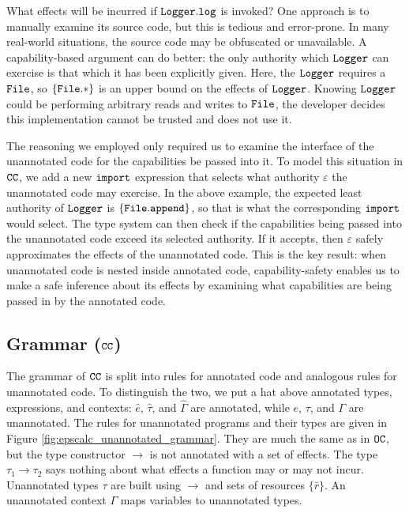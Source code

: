 What effects will be incurred if $\mathtt{Logger.log}$ is invoked? One approach is to manually examine its source code, but this is tedious and error-prone. In many real-world situations, the source code may be obfuscated or unavailable. A capability-based argument can do better: the only authority which $\mathtt{Logger}$ can exercise is that which it has been explicitly given. Here, the $\mathtt{Logger}$ requires a $\mathtt{File}$, so $\mathtt{ \{ \mathtt{File.*} \} }$ is an upper bound on the effects of $\mathtt{Logger}$. Knowing $\mathtt{Logger}$ could be performing arbitrary reads and writes to $\mathtt{File}$, the developer decides this implementation cannot be trusted and does not use it.

The reasoning we employed only required us to examine the interface of the unannotated code for the capabilities be passed into it. To model this situation in $\mathtt{CC}$, we add a new $\mathtt{import}$ expression that selects what authority $\varepsilon$ the unannotated code may exercise. In the above example, the expected least authority of $\mathtt{Logger}$ is $\{ \mathtt{File.append} \}$, so that is what the corresponding $\mathtt{import}$ would select. The type system can then check if the capabilities being passed into the unannotated code exceed its selected authority. If it accepts, then $\varepsilon$ safely approximates the effects of the unannotated code. This is the key result: when unannotated code is nested inside annotated code, capability-safety enables us to make a safe inference about its effects by examining what capabilities are being passed in by the annotated code.


\subsection{Grammar ($\mathtt{CC}$)}

The grammar of $\mathtt{CC}$ is split into rules for annotated code and analogous rules for unannotated code. To distinguish the two, we put a hat above annotated types, expressions, and contexts: $\hat e$, $\hat \tau$, and $\hat \Gamma$ are annotated, while $e$, $\tau$, and $\Gamma$ are unannotated. The rules for unannotated programs and their types are given in Figure \ref{fig:epscalc_unannotated_grammar}. They are much the same as in $\mathtt{OC}$, but the type constructor $\rightarrow$ is not annotated with a set of effects. The type $\tau_1 \rightarrow \tau_2$ says nothing about what effects a function may or may not incur. Unannotated types $\tau$ are built using $\rightarrow$ and sets of resources $\{ \bar r \}$. An unannotated context $\Gamma$ maps variables to unannotated types.

